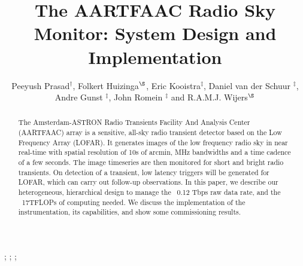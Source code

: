 \documentclass{ws-jai}
\begin{document}
\catchline{}{}{}{}{} %


\title{The AARTFAAC Radio Sky Monitor: System Design and Implementation}

\author{Peeyush Prasad$^\dagger$, Folkert Huizinga$^\S$, Eric Kooistra$^\ddagger$, Daniel van der Schuur $^\ddagger$, Andre Gunst $^\ddagger$, John Romein $^\ddagger$ and R.A.M.J. Wijers$^\S$}

\address{
$^\dagger$Anton Pannekoek Institute, University of Amsterdam, Amsterdam, The Netherlands, p.prasad@uva.nl\\
$^\ddagger$ASTRON, Oude Hoogeveensedijk, 7991PD, The Netherlands\\
$^\S$Anton Pannekoek Institute, University of Amsterdam, Amsterdam\\
}

\maketitle


\begin{history}
;
;
;
\end{history}

\begin{abstract}
The Amsterdam-ASTRON  Radio Transients  Facility And Analysis  Center (AARTFAAC)
array  is  a sensitive,  all-sky  radio  transient  detector  based on  the  Low
Frequency Array (LOFAR).  It generates images  of the low frequency radio sky in
near real-time  with spatial resolution of  10s of arcmin, MHz  bandwidths and a
time cadence of a few seconds. The image timeseries are then monitored for short
and bright radio  transients. On detection of a transient,  low latency triggers
will be  generated for LOFAR,  which can  carry out follow-up  observations.  In
this  paper, we  describe our  heterogeneous, hierarchical  design to  manage the
~0.12 Tbps raw data  rate, and the ~17TFLOPs of computing  needed.  We discuss the
implementation  of   the  instrumentation,  its  capabilities,   and  show  some
commissioning results.
\end{abstract}

\end{document}
